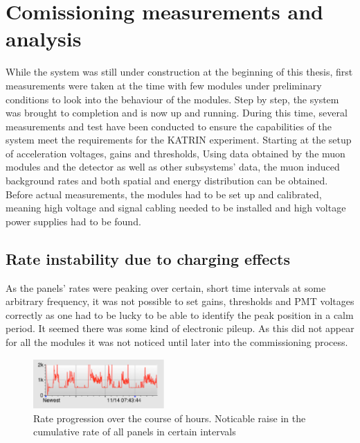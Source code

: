 %

\chapter{Comissioning measurements and analysis}
\label{ch:Analysis}

  While the system was still under construction at the beginning of this thesis, first measurements were taken at the time with few modules under preliminary conditions to look into the behaviour of the modules. Step by step, the system was brought to completion and is now up and running. During this time, several measurements and test have been conducted to ensure the capabilities of the system meet the requirements for the KATRIN experiment. Starting at the setup of acceleration voltages, gains and thresholds, 
  Using data obtained by the muon modules and the detector as well as other subsystems' data, the muon induced background rates and both spatial and energy distribution can be obtained. Before actual measurements, the modules had to be set up and calibrated, meaning high voltage and signal cabling needed to be installed and high voltage power supplies had to be found.
    \section{Rate instability due to charging effects}
    \label{ch:Analysis:sec:Rate instability due to charging effects}
  As the panels' rates were peaking over certain, short time intervals at some arbitrary frequency, it was not possible to set gains, thresholds and PMT voltages correctly as one had to be lucky to be able to identify the peak position in a calm period. It seemed there was some kind of electronic pileup. As this did not appear for all the modules it was not noticed until later into the commissioning process.
  \begin{figure}
   \centering
   \includegraphics[width=5cm]{graphics/setup/Noise_Rate_Problem_cutout.eps}
   \caption{Rate progression over the course of hours. Noticable raise in the cumulative rate of all panels in certain intervals}
  \end{figure}
  
